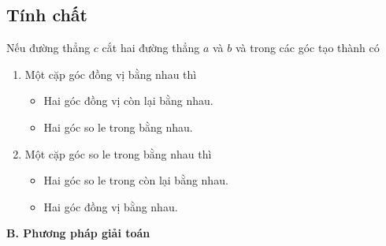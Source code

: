 \subsection{Tính chất}
Nếu đường thẳng $c$ cắt hai đường thẳng $a$ và $b$ và trong các góc tạo thành có
\begin{enumerate}[1.]
\item  Một cặp góc đồng vị bằng nhau thì
\begin{itemize}
\item Hai góc đồng vị còn lại bằng nhau.
\item Hai góc so le trong bằng nhau.
\end{itemize}
\item Một cặp góc so le trong bằng nhau thì
\begin{itemize}
\item Hai góc so le trong còn lại bằng nhau.
\item Hai góc đồng vị bằng nhau.
\end{itemize}
\end{enumerate}
{\bf B. Phương pháp giải toán}
